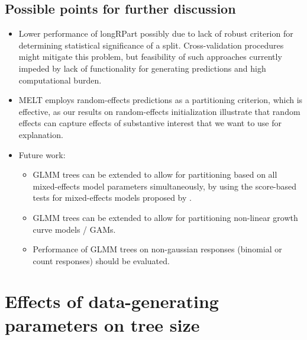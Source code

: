 \documentclass[doc,floatsintext,natbib]{apa7}
\begin{document}
\subsection{Possible points for further discussion}

\begin{itemize}

\item Lower performance of longRPart possibly due to lack of robust criterion for determining statistical significance of a split. Cross-validation procedures might mitigate this problem, but feasibility of such approaches currently impeded by lack of functionality for generating predictions and high computational burden.

\item MELT \citep{EoyCho14} employs random-effects predictions as a partitioning criterion, which is effective, as our results on random-effects initialization illustrate that random effects can capture effects of substantive interest that we want to use for explanation.

\item Future work:

\begin{itemize}
\item GLMM trees can be extended to allow for partitioning based on all mixed-effects model parameters simultaneously, by using the score-based tests for mixed-effects models proposed by \cite{WangyMerk18}.
\item GLMM trees can be extended to allow for partitioning non-linear growth curve models / GAMs. 
\item Performance of GLMM trees on non-gaussian responses (binomial or count responses) should be evaluated.
\end{itemize}
\end{itemize}





\appendix


\section{Effects of data-generating parameters on tree size}
\label{sec:AppendixA}
\end{document}
